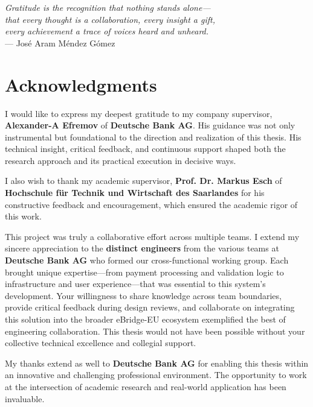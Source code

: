 
\begin{flushright}{\slshape    
    Gratitude is the recognition that nothing stands alone— \\
    that every thought is a collaboration, every insight a gift, \\
    every achievement a trace of voices heard and unheard.} \\ \medskip
    --- José Aram Méndez Gómez
\end{flushright}

\bigskip

\begingroup
\let\clearpage\relax
\let\cleardoublepage\relax
\chapter*{Acknowledgments}

I would like to express my deepest gratitude to my company supervisor, 
\textbf{Alexander-A Efremov} of \textbf{Deutsche Bank AG}. His guidance was 
not only instrumental but foundational to the direction and realization of 
this thesis. His technical insight, critical feedback, and continuous support 
shaped both the research approach and its practical execution in decisive ways.

I also wish to thank my academic supervisor, \textbf{Prof. Dr. Markus Esch} 
of \textbf{Hochschule für Technik und Wirtschaft des Saarlandes} for his constructive 
feedback and encouragement, which ensured the academic rigor of this work.

This project was truly a collaborative effort across multiple teams. I extend my 
sincere appreciation to the \textbf{distinct engineers} from the various teams at 
\textbf{Deutsche Bank AG} who formed our cross-functional working group. Each 
brought unique expertise—from payment processing and validation logic to infrastructure 
and user experience—that was essential to this system's development. Your willingness 
to share knowledge across team boundaries, provide critical feedback during design 
reviews, and collaborate on integrating this solution into the broader eBridge-EU 
ecosystem exemplified the best of engineering collaboration. This thesis would not 
have been possible without your collective technical excellence and collegial support.

My thanks extend as well to \textbf{Deutsche Bank AG} for enabling this thesis 
within an innovative and challenging professional environment. The opportunity 
to work at the intersection of academic research and real-world application 
has been invaluable.

\endgroup
